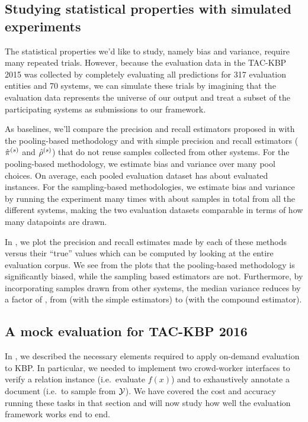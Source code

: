 \subsection{Studying statistical properties with simulated experiments}
The statistical properties we'd like to study, namely bias and variance, require many repeated trials.
However, because the evaluation data in the TAC-KBP 2015 was collected by completely evaluating all predictions for 317 evaluation entities and 70 systems, we can simulate these trials by imagining that the evaluation data represents the universe of our output and treat a subset of the participating systems as submissions to our framework.

As baselines, we'll compare the precision and recall estimators proposed in  with the pooling-based methodology and with simple precision and recall estimators (${\hat{\pi}}^{(s)}$ and ${\hat{\rho}}^{(s)}$) that do not reuse samples collected from other systems.
For the pooling-based methodology, we estimate bias and variance over many pool choices.
  On average, each pooled evaluation dataset has about  evaluated instances.
For the sampling-based methodologies, we estimate bias and variance by running the experiment many times with about  samples in total from all the different systems, making the two evaluation datasets comparable in terms of how many datapoints are drawn.

In , we plot the precision and recall estimates made by each of these methods versus their ``true'' values which can be computed by looking at the entire evaluation corpus.
We see from the plots that the pooling-based methodology is significantly biased, while the sampling based estimators are not.
Furthermore, by incorporating samples drawn from other systems, the median variance reduces by a factor of , from  (with the simple estimators) to  (with the compound estimator).

\subsection{A mock evaluation for TAC-KBP 2016}
In , we described the necessary elements required to apply on-demand evaluation to KBP.
In particular, we needed to implement two crowd-worker interfaces to verify a relation instance (i.e.\ evaluate $f(x)$) and to exhaustively annotate a document (i.e.\ to sample from $\mathcal{Y}$).
We have covered the cost and accuracy running these tasks in that section and will now study how well the evaluation framework works end to end. 

